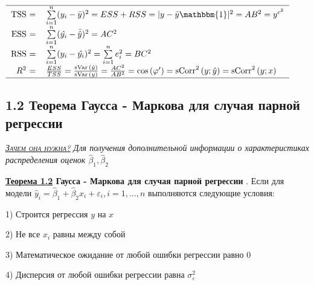 \documentclass[a0,final]{a0poster}
\DeclareMathOperator{\sCorr}{sCorr}
\DeclareMathOperator{\Var}{Var}
\DeclareMathOperator{\sVar}{sVar}
\DeclareMathOperator{\E}{E}
\begin{document}
\begin{multicols}{4}
\begin{center}
\begin{math}
\begin{tabular}{r  l}
\hline
TSS = & $\sum\limits_{i=1}^n (y_i-\bar{y})^2 = ESS + RSS = |y- \bar{y}\mathbbm {1}|^2 = AB^2 = y^{c^2}$ \\
ESS = & $\sum\limits_{i=1}^n (\hat{y_i}- \bar{\hat{y}})^2 = AC^2$ \\
RSS = & $\sum\limits_{i=1}^{n}(y_i-\hat{y_i})^2 = \sum\limits_{i=1}^{n}e^2_i = BC^2$\\
$R^2$ = & $\frac{ESS}{TSS} = \frac{ \sVar{(\hat{y})}}{ \sVar{(y)}} = \frac{AC^2}{AB^2} = \cos{(\varphi')} = \sCorr^2{(y;\hat{y})} = \sCorr^2{(y;x)}$\\
\hline
\end{tabular}
\end{math}
\end{center}

\subsection*{\textbf{1.2 Теорема Гаусса - Маркова для случая парной регрессии}}
\underline{\textsc{\textit{Зачем она нужна?}}} \textit{Для получения дополнительной информации о характеристиках распределения оценок $\hat{\beta}_1, \hat{\beta}_2$} \\
\begin{tcolorbox}[colback=red!5!white,colframe=red!75!black]
\textbf{\underline{Теорема 1.2} Гаусса - Маркова для случая парной регрессии }. Если для модели $\hat{y}_i=\hat{\beta}_1 + \hat{\beta}_2x_i + \varepsilon_i, i = 1, \ldots,n$ выполняются следующие условия:

1) Строится регрессия $y$ на $x$

2) Не все $x_i$ равны между собой

3) %
Математическое ожидание от любой ошибки регрессии равно 0

4) %
Дисперсия от любой ошибки регрессии равна $\sigma_{\varepsilon}^2$



\end{tcolorbox}
\end{multicols}
\end{document}
